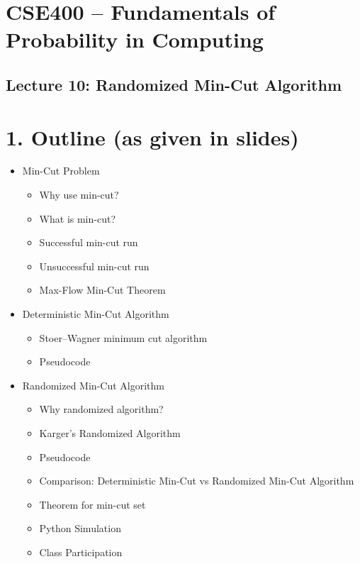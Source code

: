 \documentclass[12pt]{article}
\begin{document}
\section*{CSE400 – Fundamentals of Probability in Computing}

\subsection*{Lecture 10: Randomized Min-Cut Algorithm}

\bigskip

\section*{1. Outline (as given in slides)}

\begin{itemize}
\item Min-Cut Problem
\begin{itemize}
\item Why use min-cut?
\item What is min-cut?
\item Successful min-cut run
\item Unsuccessful min-cut run
\item Max-Flow Min-Cut Theorem
\end{itemize}

\item Deterministic Min-Cut Algorithm
\begin{itemize}
\item Stoer–Wagner minimum cut algorithm
\item Pseudocode
\end{itemize}

\item Randomized Min-Cut Algorithm
\begin{itemize}
\item Why randomized algorithm?
\item Karger’s Randomized Algorithm
\item Pseudocode
\item Comparison: Deterministic Min-Cut vs Randomized Min-Cut Algorithm
\item Theorem for min-cut set
\item Python Simulation
\item Class Participation
\end{itemize}
\end{itemize}

\bigskip
\end{document}
